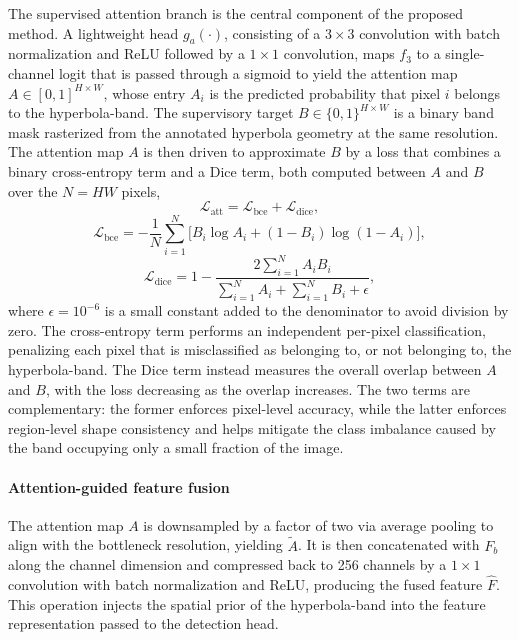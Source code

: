 \documentclass[lettersize,journal]{IEEEtran}
\begin{document}
The supervised attention branch is the central component of the proposed method. 
A lightweight head $g_a(\cdot)$, consisting of a $3\times3$ convolution with batch normalization 
and ReLU followed by a $1\times1$ convolution, maps $f_3$ to a single-channel logit 
that is passed through a sigmoid to yield the attention map $A\in[0,1]^{H\times W}$,
whose entry $A_i$ is the predicted probability that pixel $i$ belongs to the hyperbola-band.
The supervisory target $B\in\{0,1\}^{H\times W}$ is a binary band mask rasterized from the annotated hyperbola geometry at the same resolution.
The attention map $A$ is then driven to approximate $B$ by a loss that combines a binary cross-entropy term and a Dice term, both computed between $A$ and $B$ over the $N=HW$ pixels,
\begin{equation}
\mathcal{L}_{\mathrm{att}} = \mathcal{L}_{\mathrm{bce}} + \mathcal{L}_{\mathrm{dice}},
\end{equation}
\begin{equation}
\mathcal{L}_{\mathrm{bce}} = -\frac{1}{N}\sum_{i=1}^{N}\Big[B_i\log A_i + (1-B_i)\log(1-A_i)\Big],
\end{equation}
\begin{equation}
\mathcal{L}_{\mathrm{dice}} = 1 - \frac{2\sum_{i=1}^{N} A_i B_i}{\sum_{i=1}^{N} A_i + \sum_{i=1}^{N} B_i + \epsilon},
\end{equation}
where $\epsilon=10^{-6}$ is a small constant added to the denominator to avoid division by zero.
The cross-entropy term performs an independent per-pixel classification, penalizing each pixel that is misclassified as belonging to, or not belonging to, the hyperbola-band.
The Dice term instead measures the overall overlap between $A$ and $B$, with the loss decreasing as the overlap increases.
The two terms are complementary: the former enforces pixel-level accuracy, 
while the latter enforces region-level shape consistency 
and helps mitigate the class imbalance caused by the band occupying only a small fraction of the image.

\paragraph{Attention-guided feature fusion}
The attention map $A$ is  downsampled by a factor of two via average pooling 
to align with the bottleneck resolution, yielding $\tilde{A}$. 
It is then concatenated with $F_b$ along the channel dimension 
and compressed back to 256 channels by a $1\times1$ convolution with batch normalization and ReLU, 
producing the fused feature $\hat{F}$. 
This operation injects the spatial prior of the hyperbola-band into the feature representation passed to the detection head.
\end{document}
